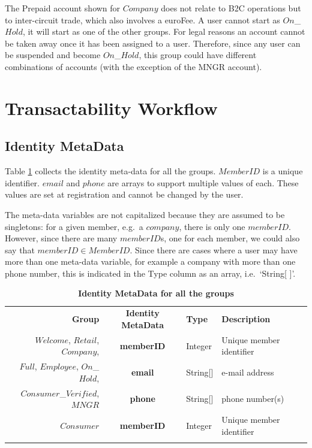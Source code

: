 The Prepaid account shown for $Company$ does not relate to B2C operations but to inter-circuit trade, which also involves a euroFee. A user cannot start as $On$\_$Hold$, it will start as one of the other groups. For legal reasons an account cannot be taken away once it has been assigned to a user. Therefore, since any user can be suspended and become $On$\_$Hold$, this group could have different combinations of accounts (with the exception of the MNGR account).

\section{Transactability Workflow}
\subsection{Identity MetaData}
Table \ref{tab:IdentityMetaData} collects the identity meta-data for all the groups. $MemberID$ is a unique identifier. $email$ and $phone$ are arrays to support multiple values of each. These values are set at registration and cannot be changed by the user.

The meta-data variables are not capitalized because they are assumed to be singletons: for a given member, e.g.\ a $company$, there is only one $memberID$. However, since there are many $memberID$s, one for each member, we could also say that $memberID \in MemberID$. Since there are cases where a user may have more than one meta-data variable, for example a company with more than one phone number, this is indicated in the Type column as an array, i.e.\ `String[ ]'.

\begin{table}[H]
\vspace{-0.3cm}
\begin{centering}
\small
{
\begin{tabular}{ r | c | l | l }
\hline
\textbf{Group}	& {\bf Identity MetaData} & {\bf Type} & {\bf Description} \\
\Xhline{1.5pt}
$Welcome$, $Retail$, $Company$,	& {\bf memberID}			&Integer	& Unique member identifier \\
$Full$, $Employee$, $On$\_$Hold$,	& {\bf email}				&String[]	& e-mail address \\		
$Consumer$\_$Verified$, $MNGR$	& {\bf phone}				&String[]	& phone number(s) \\
\hline
$Consumer$	& {\bf memberID}	&Integer & Unique member identifier \\
\Xhline{1.5pt}
\end{tabular}
}
\caption{\small\textbf{Identity MetaData for all the groups}}
\label{tab:IdentityMetaData}
\end{centering}
\vspace{-1.2cm}
\end{table}


